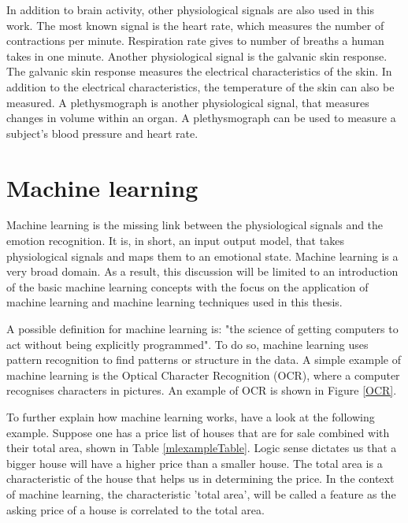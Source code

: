 In addition to brain activity, other physiological signals are also used in this work. The most known signal is the heart rate, which measures the number of contractions per minute. Respiration rate gives to number of breaths a human takes in one minute\citep{DEAP}. Another physiological signal is the galvanic skin response. The galvanic skin response measures the electrical characteristics of the skin\citep{GSR, DEAP}. In addition to the electrical characteristics, the temperature of the skin can also be measured. A plethysmograph is another physiological signal, that measures changes in volume within an organ\citep{DEAP}. A plethysmograph can be used to measure a subject's blood pressure and heart rate.

\section{Machine learning}
Machine learning is the missing link between the physiological signals and the emotion recognition. It is, in short, an input output model, that takes physiological signals and maps them to an emotional state. Machine learning is a very broad domain. As a result, this discussion will be limited to an introduction of the basic machine learning concepts with the focus on the application of machine learning and machine learning techniques used in this thesis. 

\npar

A possible definition for machine learning is: "the science of getting computers to act without being explicitly programmed"\citep{MLDef}. To do so, machine learning uses pattern recognition to find patterns or structure in the data. A simple example of machine learning is the Optical Character Recognition (OCR), where a computer recognises characters in pictures\citep{OCR}. An example of OCR is shown in Figure \ref{OCR}.


To further explain how machine learning works, have a look at the following example. Suppose one has a price list of houses that are for sale combined with their total area, shown in Table \ref{mlexampleTable}. Logic sense dictates us that a bigger house will have a higher price than a smaller house. The total area is a characteristic of the house that helps us in determining the price. In the context of machine learning, the characteristic 'total area', will be called a feature as the asking price of a house is correlated to the total area.

